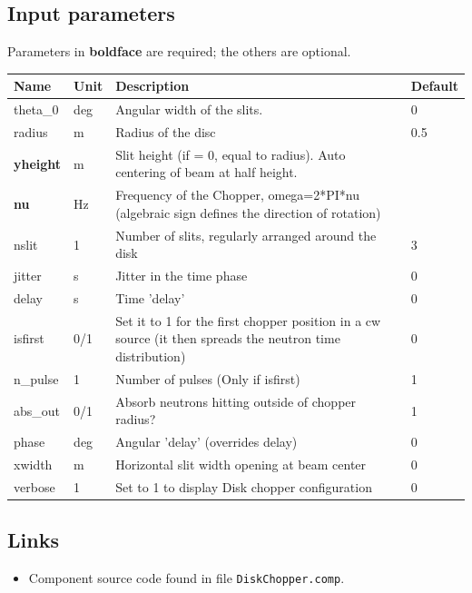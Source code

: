\subsection*{Input parameters}
Parameters in \textbf{boldface} are required; the others are optional.

\begin{longtable}{p{}p{}p{}p{}}
\toprule
\textbf{Name} & \textbf{Unit} & \textbf{Description} & \textbf{Default} \\
\midrule
\endhead
theta\_0 & deg & Angular width of the slits. & 0 \\
radius & m & Radius of the disc & 0.5 \\
\textbf{yheight} & m & Slit height (if = 0, equal to radius). Auto centering of beam at half height. &  \\
\textbf{nu} & Hz & Frequency of the Chopper, omega=2*PI*nu (algebraic sign defines the direction of rotation) &  \\
nslit & 1 & Number of slits, regularly arranged around the disk & 3 \\
jitter & s & Jitter in the time phase & 0 \\
delay & s & Time 'delay' & 0 \\
isfirst & 0/1 & Set it to 1 for the first chopper position in a cw source (it then spreads the neutron time distribution) & 0 \\
n\_pulse & 1 & Number of pulses (Only if isfirst) & 1 \\
abs\_out & 0/1 & Absorb neutrons hitting outside of chopper radius? & 1 \\
phase & deg & Angular 'delay' (overrides delay) & 0 \\
xwidth & m & Horizontal slit width opening at beam center & 0 \\
verbose & 1 & Set to 1 to display Disk chopper configuration & 0 \\
\bottomrule
\end{longtable}

\subsection*{Links}
\begin{itemize}
  \item Component source code found in file \texttt{DiskChopper.comp}.
\end{itemize}

